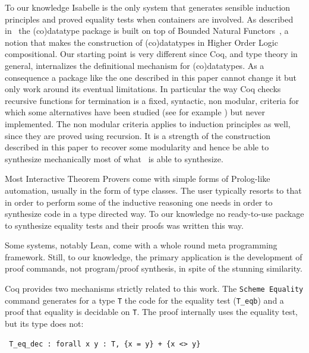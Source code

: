 \documentclass[a4paper,UKenglish,cleveref, autoref]{lipics-v2019}
\begin{document}
To our knowledge Isabelle is the only system that generates sensible induction
principles and proved equality tests when containers are involved. As described
in~\cite{10.1007/978-3-319-08970-6_7} the (co)datatype package is built on top
of Bounded Natural Functors~\cite{Traytel:2012:FCD:2358958.2359545}, a
notion that makes the construction of (co)datatypes in Higher Order Logic
compositional.  Our starting point is very different since Coq, and type theory
in general, internalizes the definitional mechanism for (co)datatypes. As
a consequence a package like the one described in this paper cannot change
it but only work around its eventual limitations.
In particular the way Coq checks recursive functions for termination is
a fixed, syntactic, non modular, criteria for which some alternatives
have been studied (see for example
\cite{DBLP:conf/lpar/BartheGP06, sacchini:pastel-00622429})
but never implemented.
The non modular criteria applies to induction principles
as well, since they are proved using recursion.
It is a strength of the construction
described in this paper to recover some modularity and hence be able to
synthesize mechanically most of what~\cite{10.1007/978-3-319-08970-6_7} is
able to synthesize. 

Most Interactive Theorem Provers come with simple forms of Prolog-like
automation, usually in the form of type classes. The user typically
resorts to that in order to perform some of the inductive reasoning
one needs in order to synthesize code in a type directed way.
To our knowledge no ready-to-use package to synthesize equality tests
and their proofs was written this way.

Some systems, notably Lean, come with a whole round meta programming 
framework. Still, to our knowledge, the primary application is the
development of proof commands, not program/proof synthesis, in spite
of the stunning similarity.

Coq provides two mechanisms strictly related to this work.
The \lstinline+Scheme Equality+ command generates for a type
\lstinline+T+ the code for the equality test (\lstinline+T_eqb+) 
and a proof that equality is decidable on \lstinline+T+. The proof
internally uses the equality test, but its type does not:

\begin{lstlisting}
 T_eq_dec : forall x y : T, {x = y} + {x <> y}
\end{lstlisting}
\end{document}
